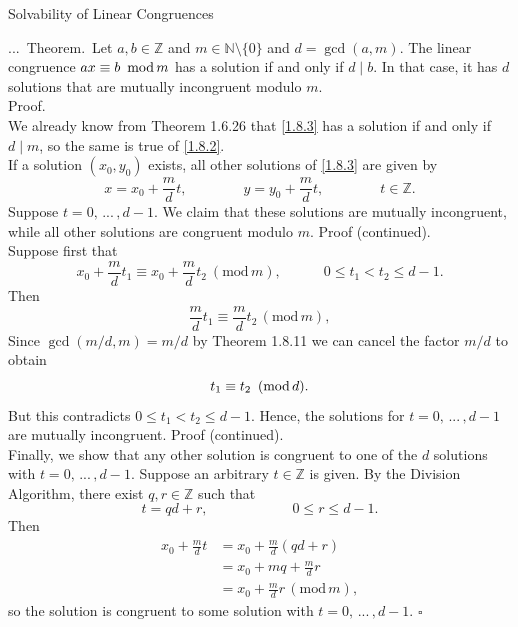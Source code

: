 \documentclass[smaller,hyperref={CJKbookmarks=true}]{beamer}
\newcommand{\N}{\mathbb{N}} \newcommand{\Z}{\mathbb{Z}} \newcommand{\Q}{\mathbb{Q}}
\newenvironment{PROOF}{{\noindent\!\sf\alert{Proof.}}\\}{\hfill$\square$\\}
\newcounter{zhuo}[subsection]
\renewcommand{\thezhuo}{\thesection.\thesubsection.\arabic{zhuo}}
\newenvironment{THEOREM}{\stepcounter{zhuo}\alert{\thezhuo.~Theorem.\,}}{}
\begin{document}
\begin{frame}{Solvability of Linear Congruences}
\begin{spacing}{1.1}
\begin{THEOREM}
Let $a,b\in\Z$ and $m\in\N\setminus\{0\}$ and $d=\gcd(a,m)$. The linear congruence $ax\equiv b\enskip\text{mod}\,m$ has a solution if and only if $d\mid b$. In that case, it has $d$ solutions that are mutually incongruent modulo $m$.\\[5pt]
\end{THEOREM}
\begin{PROOF}
We already know from Theorem 1.6.26 that \eqref{1.8.3} has a solution if and only if $d\mid m$, so the same is true of \eqref{1.8.2}.\\[4pt]
If a solution $(x_0,y_0)$ exists, all other solutions of \eqref{1.8.3} are given by
\[x=x_0+\frac{m}{d}t,\qquad\qquad
y=y_0+\frac{m}{d}t,\qquad\qquad
t\in\Z.\]
Suppose $t=0,\,...\,,d-1$. We claim that these solutions are mutually
incongruent, while all other solutions are congruent modulo $m$.
\newpage
\vspace*{5pt}
\alert{Proof (continued).}\\
Suppose first that
\[x_0+\frac{m}{d}t_1\equiv x_0+\frac{m}{d}t_2~(\text{mod}\,m),\qquad\quad
0\leq t_1<t_2\leq d-1.\]
Then
\[\frac{m}{d}t_1\equiv\frac{m}{d}t_2\,(\text{mod}\,m),\]
Since $\gcd(m/d,m)=m/d$ by Theorem 1.8.11 we can cancel the factor $m/d$ to obtain
\[t_1\equiv t_2\enskip(\text{mod}\,d).\]
But this contradicts $0\leq t_1<t_2\leq d-1$. Hence, the solutions for $t=0,\,...\,,d-1$ are mutually incongruent.
\newpage
\alert{Proof (continued).}\\
Finally, we show that any other solution is congruent to one of the $d$ solutions with $t=0,\,...\,,d-1$. Suppose an arbitrary $t\in\Z$ is given. By the Division Algorithm, there exist $q,r\in\Z$ such that
\[t=qd+r,\qquad\qquad\qquad0\leq r\leq d-1.\]
Then
\begin{equation*}
  \begin{split}
     x_0+\frac{m}{d}t &=x_0+\frac{m}{d}(qd+r) \\
       &=x_0+mq+\frac{m}{d}r \\
       &=x_0+\frac{m}{d}r\,(\text{mod}\,m),
  \end{split}
\end{equation*}
so the solution is congruent to some solution with $t=0,\,...\,,d-1$.
\end{PROOF}
\end{spacing}
\end{frame}
\end{document}
